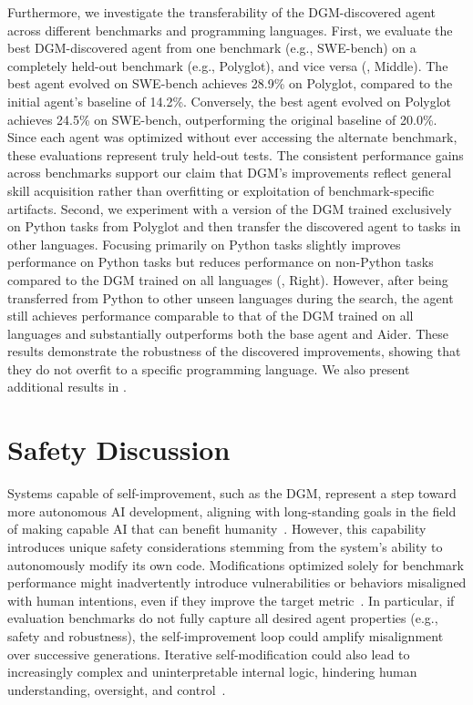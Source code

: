Furthermore, we investigate the transferability of the DGM-discovered agent across different benchmarks and programming languages. First, we evaluate the best DGM-discovered agent from one benchmark (e.g., SWE-bench) on a completely held-out benchmark (e.g., Polyglot), and vice versa (, Middle). The best agent evolved on SWE-bench achieves 28.9\% on Polyglot, compared to the initial agent's baseline of 14.2\%. Conversely, the best agent evolved on Polyglot achieves 24.5\% on SWE-bench, outperforming the original baseline of 20.0\%. Since each agent was optimized without ever accessing the alternate benchmark, these evaluations represent truly held-out tests. The consistent performance gains across benchmarks support our claim that DGM's improvements reflect general skill acquisition rather than overfitting or exploitation of benchmark-specific artifacts. Second, we experiment with a version of the DGM trained exclusively on Python tasks from Polyglot and then transfer the discovered agent to tasks in other languages. Focusing primarily on Python tasks slightly improves performance on Python tasks but reduces performance on non-Python tasks compared to the DGM trained on all languages (, Right). However, after being transferred from Python to other unseen languages during the search, the agent still achieves performance comparable to that of the DGM trained on all languages and substantially outperforms both the base agent and Aider. These results demonstrate the robustness of the discovered improvements, showing that they do not overfit to a specific programming language. We also present additional results in .

\section{Safety Discussion}
\label{sec:safety}

Systems capable of self-improvement, such as the DGM, represent a step toward more autonomous AI development, aligning with long-standing goals in the field of making capable AI that can benefit humanity~\citep{schmidhuber1987evolutionary, clune2019ai, markoff2016machines, lehman2023machine}. However, this capability introduces unique safety considerations stemming from the system's ability to autonomously modify its own code. Modifications optimized solely for benchmark performance might inadvertently introduce vulnerabilities or behaviors misaligned with human intentions, even if they improve the target metric~\citep{bostrom2020ethical}. In particular, if evaluation benchmarks do not fully capture all desired agent properties (e.g., safety and robustness), the self-improvement loop could amplify misalignment over successive generations. Iterative self-modification could also lead to increasingly complex and uninterpretable internal logic, hindering human understanding, oversight, and control~\citep{sheth2025safety, anwar2024foundational, greenblatt2024alignment, ganguli2022red}.

